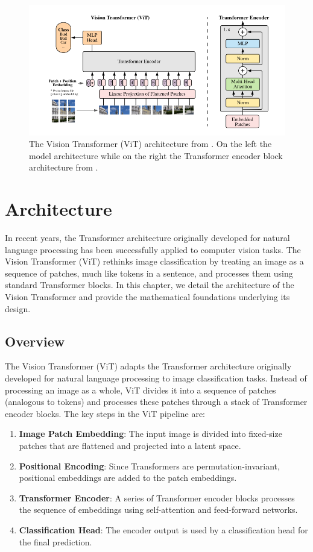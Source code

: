 \begin{figure}[t]
    \center
    \includegraphics[width=1\textwidth]{images/vit-architecture.png}
    \caption{The Vision Transformer (ViT) architecture from \cite{alexey2020image}. On the left the model architecture while on the right the Transformer encoder block architecture from \cite{vaswani2017attention}.}
    \label{fig:vit-architecture}
\end{figure}

\section{Architecture}

In recent years, the Transformer architecture originally developed for natural language processing has been successfully applied to computer vision tasks. The Vision Transformer (ViT) rethinks image classification by treating an image as a sequence of patches, much like tokens in a sentence, and processes them using standard Transformer blocks. In this chapter, we detail the architecture of the Vision Transformer and provide the mathematical foundations underlying its design.

\subsection{Overview}
The Vision Transformer (ViT) adapts the Transformer architecture originally developed for natural language processing to image classification tasks. Instead of processing an image as a whole, ViT divides it into a sequence of patches (analogous to tokens) and processes these patches through a stack of Transformer encoder blocks. The key steps in the ViT pipeline are:

\begin{enumerate}
    \item \textbf{Image Patch Embedding}: The input image is divided into fixed-size patches that are flattened and projected into a latent space.
    \item \textbf{Positional Encoding}: Since Transformers are permutation-invariant, positional embeddings are added to the patch embeddings.
    \item \textbf{Transformer Encoder}: A series of Transformer encoder blocks processes the sequence of embeddings using self-attention and feed-forward networks.
    \item \textbf{Classification Head}: The encoder output is used by a classification head for the final prediction.
\end{enumerate}

